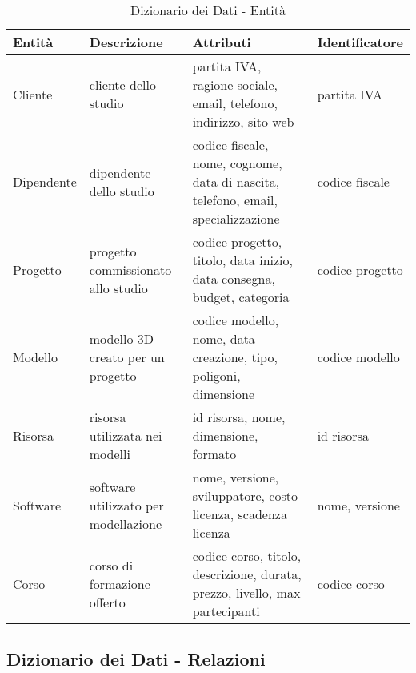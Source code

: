 \documentclass[a4paper,11pt]{article}
\begin{document}
{\begin{table}[h]
\centering
\begin{tabular}{|p{2cm}|p{4cm}|p{6cm}|p{4cm}|}
\hline
\textbf{Entità} & \textbf{Descrizione} & \textbf{Attributi} & \textbf{Identificatore} \\
\hline
Cliente & cliente dello studio & partita IVA, ragione sociale, email, telefono, indirizzo, sito web & partita IVA \\
\hline
Dipendente & dipendente dello studio & codice fiscale, nome, cognome, data di nascita, telefono, email, specializzazione & codice fiscale \\
\hline
Progetto & progetto commissionato allo studio & codice progetto, titolo, data inizio, data consegna, budget, categoria & codice progetto \\
\hline
Modello & modello 3D creato per un progetto & codice modello, nome, data creazione, tipo, poligoni, dimensione & codice modello \\
\hline
Risorsa & risorsa utilizzata nei modelli & id risorsa, nome, dimensione, formato & id risorsa \\
\hline
Software & software utilizzato per modellazione & nome, versione, sviluppatore, costo licenza, scadenza licenza & nome, versione \\
\hline
Corso & corso di formazione offerto & codice corso, titolo, descrizione, durata, prezzo, livello, max partecipanti & codice corso \\
\hline
\end{tabular}
\caption{Dizionario dei Dati - Entità}
\end{table}
\newpage


\subsection{Dizionario dei Dati - Relazioni}

}
\end{document}
